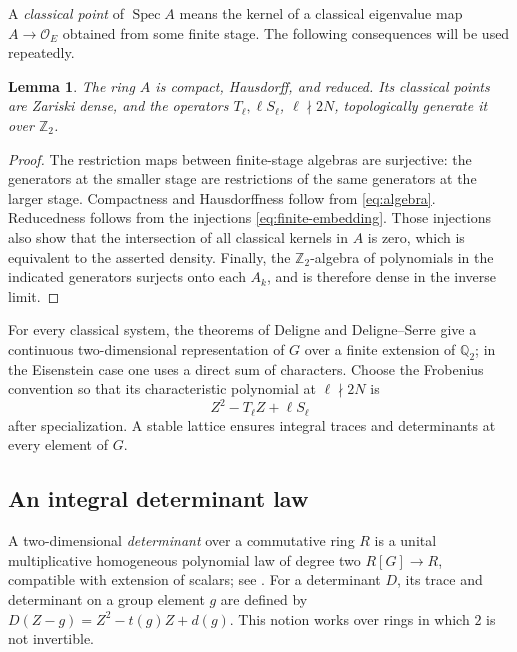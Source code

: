 \documentclass[11pt]{article}
\newtheorem{lemma}[theorem]{Lemma}
\theoremstyle{remark}
\numberwithin{equation}{section}
\newcommand{\Z}{\mathbb Z}
\newcommand{\Q}{\mathbb Q}
\newcommand{\OO}{\mathcal O}
\DeclareMathOperator{\Spec}{Spec}
\begin{document}
A \emph{classical point} of $\Spec A$ means the kernel of a
classical eigenvalue map $A\to\OO_E$ obtained from some finite
stage. The following consequences will be used repeatedly.

\begin{lemma}\label{lem:density}
The ring $A$ is compact, Hausdorff, and reduced. Its classical points
are Zariski dense, and the operators $T_\ell,\ell S_\ell$,
$\ell\nmid2N$, topologically generate it over $\Z_2$.
\end{lemma}
\begin{proof}
The restriction maps between finite-stage algebras are surjective:
the generators at the smaller stage are restrictions of the same
generators at the larger stage. Compactness and Hausdorffness follow
from \eqref{eq:algebra}. Reducedness follows from the injections
\eqref{eq:finite-embedding}. Those injections also show that the
intersection of all classical kernels in $A$ is zero, which is
equivalent to the asserted density. Finally, the $\Z_2$-algebra of
polynomials in the indicated generators surjects onto each $A_k$,
and is therefore dense in the inverse limit.
\end{proof}

For every classical system, the theorems of Deligne and
Deligne--Serre \cite{Deligne71,DeligneSerre74} give a continuous
two-dimensional representation of $G$ over a finite extension of
$\Q_2$; in the Eisenstein case one uses a direct sum of characters.
Choose the Frobenius convention so that its characteristic polynomial
at $\ell\nmid2N$ is
\begin{equation}\label{eq:frobenius}
 Z^2-T_\ell Z+\ell S_\ell
\end{equation}
after specialization. A stable lattice ensures integral traces and
determinants at every element of $G$.

\subsection{An integral determinant law}
A two-dimensional \emph{determinant} over a commutative ring $R$ is
a unital multiplicative homogeneous polynomial law of degree two
$R[G]\to R$, compatible with extension of scalars; see
\cite[Section~1]{Chenevier14}. For a determinant $D$, its trace
and determinant on a group element $g$ are defined by
$D(Z-g)=Z^2-t(g)Z+d(g)$. This notion works over rings
in which $2$ is not invertible.
\end{document}
